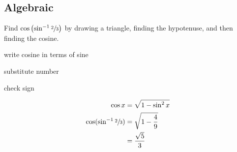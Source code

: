 \documentclass{exam}
\begin{document}
  \subsection{Algebraic}

  Find $\cos \left( \sin^{-1}{\sfrac{2}{3}} \right)$ by drawing a triangle, finding the hypotenuse, and then finding the
  cosine.

  \begin{itemize*}
    \item write cosine in terms of sine
    \item substitute number
    \item check sign
  \end{itemize*}

  \begin{align*}
    \cos x                           & = \sqrt{1 - \sin^2 x} \\
    \cos ( \sin^{-1}{\sfrac{2}{3}} ) & = \sqrt{1 - \frac{4}{9}} \\
                                     & = \frac{\sqrt{5}}{3} \\
  \end{align*}
\end{document}
